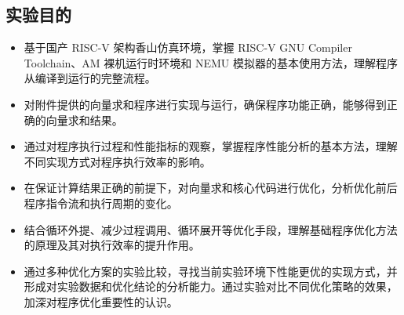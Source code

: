 \subsection{实验目的}
\begin{itemize}
    \item 基于国产 RISC-V 架构香山仿真环境，掌握 RISC-V GNU Compiler Toolchain、AM 裸机运行时环境和 NEMU 模拟器的基本使用方法，理解程序从编译到运行的完整流程。
    \item 对附件提供的向量求和程序进行实现与运行，确保程序功能正确，能够得到正确的向量求和结果。
    \item 通过对程序执行过程和性能指标的观察，掌握程序性能分析的基本方法，理解不同实现方式对程序执行效率的影响。
    \item 在保证计算结果正确的前提下，对向量求和核心代码进行优化，分析优化前后程序指令流和执行周期的变化。
    \item 结合循环外提、减少过程调用、循环展开等优化手段，理解基础程序优化方法的原理及其对执行效率的提升作用。
    \item 通过多种优化方案的实验比较，寻找当前实验环境下性能更优的实现方式，并形成对实验数据和优化结论的分析能力。通过实验对比不同优化策略的效果，加深对程序优化重要性的认识。
\end{itemize}